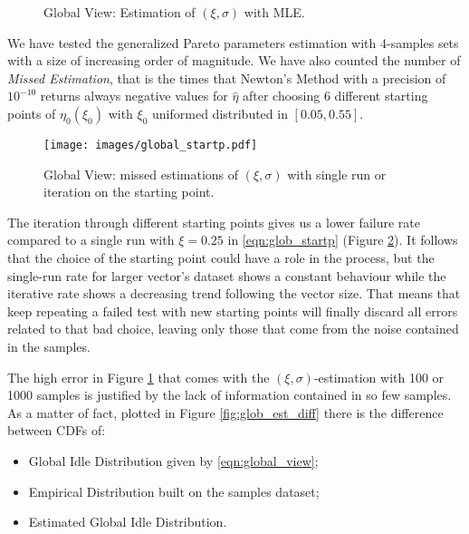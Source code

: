 \begin{figure}[!htbp]
	\centering
	\caption{Global View: Estimation of $(\xi, \sigma)$ with \ac{MLE}.}
	\label{fig:glob_est}
\end{figure}

We have tested the generalized Pareto parameters estimation with 4-samples sets with a size of increasing order of magnitude. We have also counted the number of \textit{Missed Estimation}, that is the times that Newton's Method with a precision of $10^{-10}$ returns always negative values for $\hat{\eta}$ after choosing 6 different starting points of $\eta_0(\xi_0)$ with $\xi_0$ uniformed distributed in $[0.05,0.55]$.

\begin{figure}[!htbp]
	\begin{center}
		\texttt{[image: images/global\_startp.pdf]}
	\end{center}
	\caption{Global View: missed estimations of $(\xi, \sigma)$ with single run or iteration on the starting point.}
	\label{fig:glob_est_startp}
\end{figure}

The iteration through different starting points gives us a lower failure rate compared to a single run with $\xi = 0.25$ in \eqref{eqn:glob_startp} (Figure \ref{fig:glob_est_startp}). It follows that the choice of the starting point could have a role in the process, but the single-run rate for larger vector's dataset shows a constant behaviour while the iterative rate shows a decreasing trend following the vector size. That means that keep repeating a failed test with new starting points will finally discard all errors related to that bad choice, leaving only those that come from the noise contained in the samples.

The high error in Figure \ref{fig:glob_est} that comes with the $(\xi, \sigma)$-estimation with 100 or 1000 samples is justified by the lack of information contained in so few samples. As a matter of fact, plotted in Figure \ref{fig:glob_est_diff} there is the difference between \acp{CDF} of:
\begin{itemize}
	\item Global Idle Distribution given by \eqref{eqn:global_view};
	\item Empirical Distribution built on the samples dataset;
	\item Estimated Global Idle Distribution.
\end{itemize}

